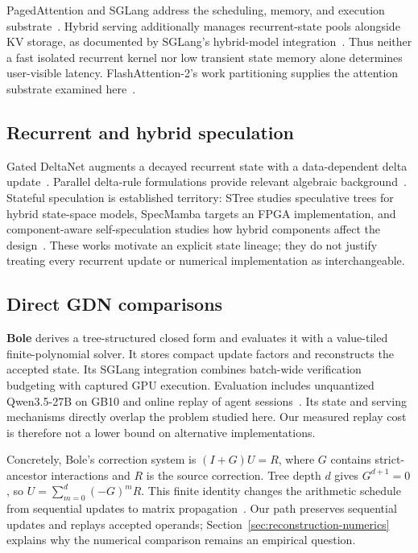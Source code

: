 \documentclass[conference]{IEEEtran}
\begin{document}
PagedAttention and SGLang address the scheduling, memory, and execution substrate~\cite{kwon2023efficient,zheng2024sglang}. Hybrid serving additionally manages recurrent-state pools alongside KV storage, as documented by SGLang's hybrid-model integration~\cite{pytorch2025sglang,sglang2026qwen}. Thus neither a fast isolated recurrent kernel nor low transient state memory alone determines user-visible latency. FlashAttention-2's work partitioning supplies the attention substrate examined here~\cite{dao2023flashattention}.

\subsection{Recurrent and hybrid speculation}
Gated DeltaNet augments a decayed recurrent state with a data-dependent delta update~\cite{yang2024gated}. Parallel delta-rule formulations provide relevant algebraic background~\cite{yang2024delta}. Stateful speculation is established territory: STree studies speculative trees for hybrid state-space models, SpecMamba targets an FPGA implementation, and component-aware self-speculation studies how hybrid components affect the design~\cite{wu2025stree,zhong2025specmamba,borobia2026component}. These works motivate an explicit state lineage; they do not justify treating every recurrent update or numerical implementation as interchangeable.

\subsection{Direct GDN comparisons}
\textbf{Bole} derives a tree-structured closed form and evaluates it with a value-tiled finite-polynomial solver. It stores compact update factors and reconstructs the accepted state. Its SGLang integration combines batch-wide verification budgeting with captured GPU execution. Evaluation includes unquantized Qwen3.5-27B on GB10 and online replay of agent sessions~\cite{wang2026bole}. Its state and serving mechanisms directly overlap the problem studied here. Our measured replay cost is therefore not a lower bound on alternative implementations.

Concretely, Bole's correction system is $(I+G)U=R$, where $G$ contains strict-ancestor interactions and $R$ is the source correction. Tree depth $d$ gives $G^{d+1}=0$, so $U=\sum_{m=0}^{d}(-G)^mR$. This finite identity changes the arithmetic schedule from sequential updates to matrix propagation~\cite{wang2026bole}. Our path preserves sequential updates and replays accepted operands; Section~\ref{sec:reconstruction-numerics} explains why the numerical comparison remains an empirical question.
\end{document}
